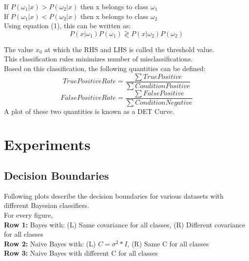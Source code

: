 \documentclass[11pt,a4paper]{article}
\begin{document}
If $P(\omega_1 | x) > P(\omega_2 | x)$ then x belongs to class $\omega_1$
\\If $P(\omega_1 | x) < P(\omega_2 | x)$ then x belongs to class $\omega_2$\\

Using equation (1), this can be written as:
 \begin{equation}
 {P(x| \omega_1)P(\omega_1) \gtrless P(x | \omega_2)P(\omega_2)}
 \end{equation}

 The value $x_0$ at which the RHS and LHS is called the threshold value. \\

This classification rules minimizes number of misclassifications. \\

Based on this classification, the following quantities can be defined:\\ 
\begin{equation}
True Positive Rate = \frac{\sum True Positive}{\sum Condition Positive} 
\end{equation}
\begin{equation}
False Positive Rate = \frac{\sum False Positive}{\sum Condition Negative} 
\end{equation}
A plot of these two quantities is known as a DET Curve. 

\clearpage
\section{Experiments}

\subsection{Decision Boundaries}
Following plots describe the decision boundaries for various datasets with different Bayesian classifiers. \\

For every figure,\\
\textbf{Row 1:} Bayes with: (L) Same covariance for all classes, (R) Different covariance for all classes\\
\textbf{Row 2:\textbf{}} Naive Bayes with: (L) $C = \sigma^2*I$, (R) Same C for all classes\\
\textbf{Row 3:} Naive Bayes with different C for all classes\\
\end{document}

